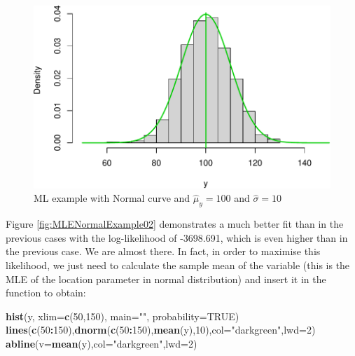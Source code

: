 \documentclass[
]{book}
\newenvironment{Shaded}{\begin{snugshade}}{\end{snugshade}}
\newcommand{\AttributeTok}[1]{\textcolor[rgb]{0.13,0.29,0.53}{#1}}
\newcommand{\ConstantTok}[1]{\textcolor[rgb]{0.56,0.35,0.01}{#1}}
\newcommand{\DecValTok}[1]{\textcolor[rgb]{0.00,0.00,0.81}{#1}}
\newcommand{\FunctionTok}[1]{\textcolor[rgb]{0.13,0.29,0.53}{\textbf{#1}}}
\newcommand{\NormalTok}[1]{#1}
\newcommand{\SpecialCharTok}[1]{\textcolor[rgb]{0.81,0.36,0.00}{\textbf{#1}}}
\newcommand{\StringTok}[1]{\textcolor[rgb]{0.31,0.60,0.02}{#1}}
\theoremstyle{definition}
\theoremstyle{definition}
\theoremstyle{definition}
\theoremstyle{definition}
\theoremstyle{remark}
\begin{document}
\begin{figure}
\centering
\includegraphics{Svetunkov---Statistics-for-Business-Analytics_files/figure-latex/MLENormalExample03-1.pdf}
\caption{\label{fig:MLENormalExample03}ML example with Normal curve and \(\hat{\mu}_y=100\) and \(\hat{\sigma}=10\)}
\end{figure}

Figure \ref{fig:MLENormalExample02} demonstrates a much better fit than in the previous cases with the log-likelihood of -3698.691, which is even higher than in the previous case. We are almost there. In fact, in order to maximise this likelihood, we just need to calculate the sample mean of the variable (this is the MLE of the location parameter in normal distribution) and insert it in the function to obtain:

\begin{Shaded}
\begin{Highlighting}[]
\FunctionTok{hist}\NormalTok{(y, }\AttributeTok{xlim=}\FunctionTok{c}\NormalTok{(}\DecValTok{50}\NormalTok{,}\DecValTok{150}\NormalTok{), }\AttributeTok{main=}\StringTok{""}\NormalTok{, }\AttributeTok{probability=}\ConstantTok{TRUE}\NormalTok{)}
\FunctionTok{lines}\NormalTok{(}\FunctionTok{c}\NormalTok{(}\DecValTok{50}\SpecialCharTok{:}\DecValTok{150}\NormalTok{),}\FunctionTok{dnorm}\NormalTok{(}\FunctionTok{c}\NormalTok{(}\DecValTok{50}\SpecialCharTok{:}\DecValTok{150}\NormalTok{),}\FunctionTok{mean}\NormalTok{(y),}\DecValTok{10}\NormalTok{),}\AttributeTok{col=}\StringTok{"darkgreen"}\NormalTok{,}\AttributeTok{lwd=}\DecValTok{2}\NormalTok{)}
\FunctionTok{abline}\NormalTok{(}\AttributeTok{v=}\FunctionTok{mean}\NormalTok{(y),}\AttributeTok{col=}\StringTok{"darkgreen"}\NormalTok{,}\AttributeTok{lwd=}\DecValTok{2}\NormalTok{)}
\end{Highlighting}
\end{Shaded}
\end{document}

